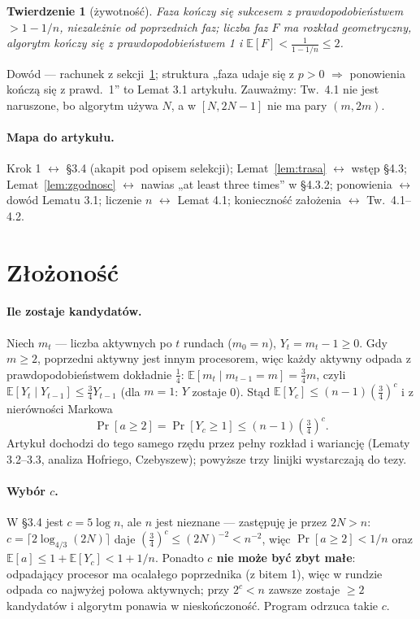 \documentclass[11pt,a4paper]{article}
\newtheorem{twierdzenie}{Twierdzenie}
\theoremstyle{definition}
\begin{document}
\begin{twierdzenie}[żywotność]
Faza kończy się sukcesem z prawdopodobieństwem $>1-1/n$, niezależnie od poprzednich faz; liczba faz $F$ ma
rozkład geometryczny, algorytm kończy się z prawdopodobieństwem 1 i $\mathbb{E}[F]<\frac{1}{1-1/n}\le2$.
\end{twierdzenie}
\noindent Dowód — rachunek z sekcji~\ref{sec:zlozonosc}; struktura „faza udaje się z $p>0$ $\Rightarrow$
ponowienia kończą się z prawd.~1” to Lemat 3.1 artykułu. Zauważmy: Tw.~4.1 nie jest naruszone, bo
algorytm używa $N$, a w $[N,2N-1]$ nie ma pary $(m,2m)$.

\paragraph{Mapa do artykułu.} Krok 1 $\leftrightarrow$ §3.4 (akapit pod opisem selekcji); Lemat~\ref{lem:trasa}
$\leftrightarrow$ wstęp §4.3; Lemat~\ref{lem:zgodnosc} $\leftrightarrow$ nawias „at least three times”
w §4.3.2; ponowienia $\leftrightarrow$ dowód Lematu 3.1; liczenie $n$ $\leftrightarrow$ Lemat 4.1;
konieczność założenia $\leftrightarrow$ Tw.\ 4.1–4.2.

\section{Złożoność}\label{sec:zlozonosc}

\paragraph{Ile zostaje kandydatów.} Niech $m_t$ — liczba aktywnych po $t$ rundach ($m_0=n$),
$Y_t=m_t-1\ge0$. Gdy $m\ge2$, poprzedni aktywny jest innym procesorem, więc każdy aktywny odpada
z prawdopodobieństwem dokładnie $\frac14$: $\mathbb{E}[m_t\mid m_{t-1}=m]=\frac34m$, czyli
$\mathbb{E}[Y_t\mid Y_{t-1}]\le\frac34Y_{t-1}$ (dla $m=1$: $Y$ zostaje 0). Stąd
$\mathbb{E}[Y_c]\le(n-1)(\frac34)^c$ i z nierówności Markowa
\[
\Pr[a\ge2]=\Pr[Y_c\ge1]\le(n-1)\left(\tfrac34\right)^c .
\]
Artykuł dochodzi do tego samego rzędu przez pełny rozkład i wariancję (Lematy 3.2–3.3, analiza Hofriego,
Czebyszew); powyższe trzy linijki wystarczają do tezy.

\paragraph{Wybór $c$.} W §3.4 jest $c=5\log n$, ale $n$ jest nieznane — zastępuję je przez $2N>n$:
$c=\lceil2\log_{4/3}(2N)\rceil$ daje $(\frac34)^c\le(2N)^{-2}<n^{-2}$, więc $\Pr[a\ge2]<1/n$ oraz
$\mathbb{E}[a]\le1+\mathbb{E}[Y_c]<1+1/n$. Ponadto \textbf{$c$ nie może być zbyt małe}: odpadający
procesor ma ocalałego poprzednika (z bitem 1), więc w rundzie odpada co najwyżej połowa aktywnych;
przy $2^c<n$ zawsze zostaje $\ge2$ kandydatów i algorytm ponawia w nieskończoność. Program odrzuca takie $c$.
\end{document}
